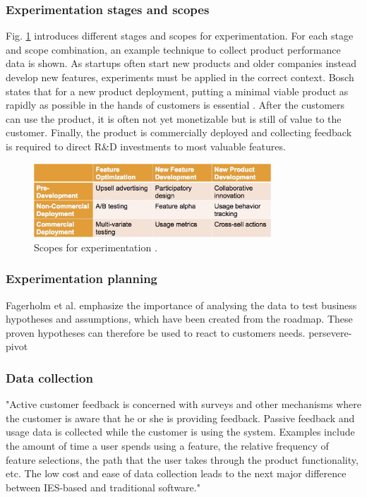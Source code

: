 \documentclass[english]{tktltiki2}
\theoremstyle{definition}
\theoremstyle{remark}
\begin{document}
\subsubsection{Experimentation stages and scopes}
Fig. \ref{fig4} introduces different stages and scopes for experimentation. For each stage and scope combination, an example technique to collect product performance data is shown. As startups often start new products and older companies instead develop new features, experiments must be applied in the correct context. Bosch states that for a new product deployment, putting a minimal viable product as rapidly as possible in the hands of customers is essential \cite{bosch2012building}. After the customers can use the product, it is often not yet monetizable but is still of value to the customer. Finally, the product is commercially deployed and collecting feedback is required to direct R\&D investments to most valuable features.
\begin{figure}[h]
	\centering
	\includegraphics[width=3.5in]{scopes.jpg}
	\caption{Scopes for experimentation \cite{bosch2012building}.}
	\label{fig4}
\end{figure}

\subsubsection{Experimentation planning}
Fagerholm et al. emphasize the importance of analysing the data to test business hypotheses and assumptions, which have been created from the roadmap. These proven hypotheses can therefore be used to react to customers needs. 
persevere-pivot

\subsubsection{Data collection}
"Active customer feedback is concerned with surveys and other mechanisms where the customer is aware that he or she is providing feedback. Passive feedback and usage data is collected while the customer is using the system. Examples include the amount of time a user spends using a feature, the relative frequency of feature selections, the path that the user takes through the product functionality, etc. The low cost and ease of data collection leads to the next major difference between IES-based and traditional software." \cite{bosch2012building}
\end{document}
